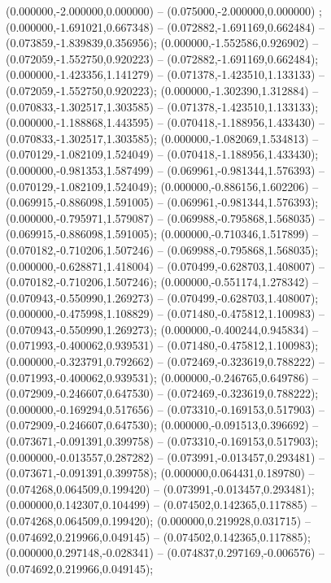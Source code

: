  (0.000000,-2.000000,0.000000) -- (0.075000,-2.000000,0.000000) ;
 (0.000000,-1.691021,0.667348) -- (0.072882,-1.691169,0.662484) -- (0.073859,-1.839839,0.356956);
 (0.000000,-1.552586,0.926902) -- (0.072059,-1.552750,0.920223) -- (0.072882,-1.691169,0.662484);
 (0.000000,-1.423356,1.141279) -- (0.071378,-1.423510,1.133133) -- (0.072059,-1.552750,0.920223);
 (0.000000,-1.302390,1.312884) -- (0.070833,-1.302517,1.303585) -- (0.071378,-1.423510,1.133133);
 (0.000000,-1.188868,1.443595) -- (0.070418,-1.188956,1.433430) -- (0.070833,-1.302517,1.303585);
 (0.000000,-1.082069,1.534813) -- (0.070129,-1.082109,1.524049) -- (0.070418,-1.188956,1.433430);
 (0.000000,-0.981353,1.587499) -- (0.069961,-0.981344,1.576393) -- (0.070129,-1.082109,1.524049);
 (0.000000,-0.886156,1.602206) -- (0.069915,-0.886098,1.591005) -- (0.069961,-0.981344,1.576393);
 (0.000000,-0.795971,1.579087) -- (0.069988,-0.795868,1.568035) -- (0.069915,-0.886098,1.591005);
 (0.000000,-0.710346,1.517899) -- (0.070182,-0.710206,1.507246) -- (0.069988,-0.795868,1.568035);
 (0.000000,-0.628871,1.418004) -- (0.070499,-0.628703,1.408007) -- (0.070182,-0.710206,1.507246);
 (0.000000,-0.551174,1.278342) -- (0.070943,-0.550990,1.269273) -- (0.070499,-0.628703,1.408007);
 (0.000000,-0.475998,1.108829) -- (0.071480,-0.475812,1.100983) -- (0.070943,-0.550990,1.269273);
 (0.000000,-0.400244,0.945834) -- (0.071993,-0.400062,0.939531) -- (0.071480,-0.475812,1.100983);
 (0.000000,-0.323791,0.792662) -- (0.072469,-0.323619,0.788222) -- (0.071993,-0.400062,0.939531);
 (0.000000,-0.246765,0.649786) -- (0.072909,-0.246607,0.647530) -- (0.072469,-0.323619,0.788222);
 (0.000000,-0.169294,0.517656) -- (0.073310,-0.169153,0.517903) -- (0.072909,-0.246607,0.647530);
 (0.000000,-0.091513,0.396692) -- (0.073671,-0.091391,0.399758) -- (0.073310,-0.169153,0.517903);
 (0.000000,-0.013557,0.287282) -- (0.073991,-0.013457,0.293481) -- (0.073671,-0.091391,0.399758);
 (0.000000,0.064431,0.189780) -- (0.074268,0.064509,0.199420) -- (0.073991,-0.013457,0.293481);
 (0.000000,0.142307,0.104499) -- (0.074502,0.142365,0.117885) -- (0.074268,0.064509,0.199420);
 (0.000000,0.219928,0.031715) -- (0.074692,0.219966,0.049145) -- (0.074502,0.142365,0.117885);
 (0.000000,0.297148,-0.028341) -- (0.074837,0.297169,-0.006576) -- (0.074692,0.219966,0.049145);
